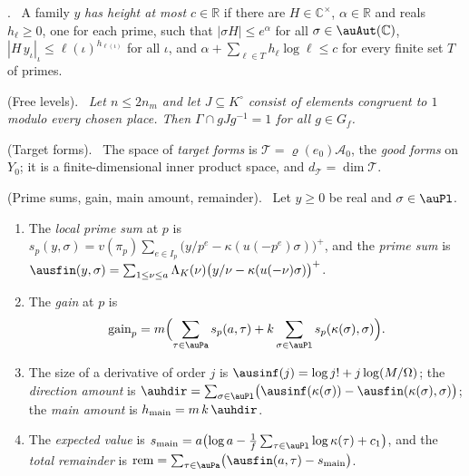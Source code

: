 \documentclass[10pt]{amsart}
\theoremstyle{definition}
\theoremstyle{remark}
\newcommand{\C}{\mathbb C}
\newcommand{\R}{\mathbb R}
\providecommand{\auAz}{\mathcal A_0}
\providecommand{\auT}{\mathcal T}
\providecommand{\audT}{d_{\auT}}
\providecommand{\augain}{\operatorname{gain}}
\providecommand{\auhmain}{h_{\mathrm{main}}}
\providecommand{\aurem}{\operatorname{rem}}
\providecommand{\ausmain}{s_{\mathrm{main}}}
\newenvironment{quotedthm}[2]{\par\medskip\noindent\begingroup
  \textbf{#1}#2.\ \itshape\ignorespaces}{\endgroup\par\medskip}
\newenvironment{quoteddef}[2]{\par\medskip\noindent\begingroup
  \textbf{#1}#2.\ \ignorespaces}{\endgroup\par\medskip}
\begin{document}
\begin{quoteddef}{\cite[Definition~14.1]{P46}}{}
A family $y$ \emph{has height at most $c\in\R$} if there are $H\in\C^\times$, $\alpha\in\R$ and
reals $h_\ell\ge0$, one for each prime, such that $|\sigma H|\le e^\alpha$ for all
$\sigma\in\auAut(\C)$, $|H\,y_\iota|_\iota\le\ell(\iota)^{h_{\ell(\iota)}}$ for all $\iota$, and
$\alpha+\sum_{\ell\in T}h_\ell\log\ell\le c$ for every finite set $T$ of primes.
\end{quoteddef}

\begin{quotedthm}{\cite[Lemma~14.5]{P46}}{ (Free levels)}
Let $n\le2n_m$ and let $J\subseteq K^\circ$ consist of elements congruent to $1$ modulo every
chosen place. Then $\Gamma\cap gJg^{-1}=1$ for all $g\in G_f$.
\end{quotedthm}

\begin{quoteddef}{\cite[Definition~14.6]{P46}}{ (Target forms)}
The space of \emph{target forms} is $\auT=\varrho(e_0)\auAz$, the \emph{good forms} on $Y_0$; it
is a finite-dimensional inner product space, and $\audT=\dim\auT$.
\end{quoteddef}

\begin{quoteddef}{\cite[Definition~14.8]{P46}}{ (Prime sums, gain, main amount, remainder)}
Let $y\ge0$ be real and $\sigma\in\auPl$.
\begin{enumerate}
\item[(a)] The \emph{local prime sum} at $p$ is
$s_p(y,\sigma)=v(\pi_p)\sum_{e\in I_p}\bigl(y/p^e-\kappa(u(-p^e)\sigma)\bigr)^+$, and the
\emph{prime sum} is
$\ausfin(y,\sigma)=\sum_{1\le\nu\le a}\Lambda_K(\nu)\bigl(y/\nu-\kappa(u(-\nu)\sigma)\bigr)^+$.
\item[(b)] The \emph{gain} at $p$ is
\[
\augain_p=m\Bigl(\sum_{\tau\in\auPa}s_p(a,\tau)+k\sum_{\sigma\in\auPl}s_p(\kappa(\sigma),\sigma)
\Bigr).
\]
\item[(c)] The size of a derivative of order $j$ is $\ausinf(j)=\log j!+j\log(M/\Omega)$; the
\emph{direction amount} is $\auhdir=\sum_{\sigma\in\auPl}\bigl(\ausinf(\kappa(\sigma))-
\ausfin(\kappa(\sigma),\sigma)\bigr)$; the \emph{main amount} is $\auhmain=m\,k\,\auhdir$.
\item[(d)] The \emph{expected value} is
$\ausmain=a\bigl(\log a-\tfrac1f\sum_{\tau\in\auPl}\log\kappa(\tau)+c_1\bigr)$, and the
\emph{total remainder} is $\aurem=\sum_{\tau\in\auPa}\bigl(\ausfin(a,\tau)-\ausmain\bigr)$.
\end{enumerate}
\end{quoteddef}
\end{document}
